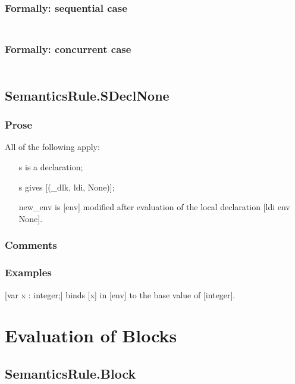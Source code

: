 \documentclass{book}
\begin{document}
  \subsection{Formally: sequential case}
  \begin{align}
  \end{align} 

  \subsection{Formally: concurrent case}
  \begin{align}
  \end{align} 

\section{SemanticsRule.SDeclNone \label{sec:SemanticsRule.SDeclNone}}

    \subsection{Prose}
    All of the following apply:
    \begin{itemize}
    \item [s] is a declaration;
    \item [s] gives [(\_dlk, ldi, None)];
    \item [new\_env] is [env] modified after evaluation of the local declaration
      [ldi env None]. 
    \end{itemize}

    \subsection{Comments}

    \subsection{Examples}
    [var x : integer;] binds [x] in [env] to the base value of [integer].

\chapter{Evaluation of Blocks \label{chap:eval_block}}
 
\section{SemanticsRule.Block \label{sec:SemanticsRule.Block}}
\end{document}
